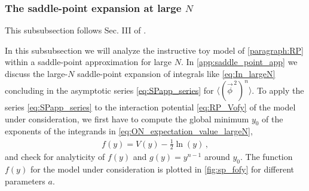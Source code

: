 \subsubsection{The saddle-point expansion at large \texorpdfstring{$N$}{N}}\label{subsubsec:saddle_point}
\begin{disclaimer}
	This subsubsection follows Sec. III of .
\end{disclaimer}
In this subsubsection we will analyze the instructive toy model of \cref{paragraph:RP} within a saddle-point approximation for large $N$.
In \cref{app:saddle_point_app} we discuss the large-$N$ saddle-point expansion of integrals like \eqref{eq:In_largeN} concluding in the asymptotic series \eqref{eq:SPapp_series} for $\langle ( \vec{\phi}^{\, 2} )^n \rangle$.
To apply the series \eqref{eq:SPapp_series} to the interaction potential \eqref{eq:RP_Vofy} of the model under consideration, we first have to compute the global minimum $y_0$ of the exponents of the integrands in \cref{eq:ON_expectation_value_largeN},
\begin{align}
	f ( y ) = V ( y ) - \tfrac{1}{2} \ln ( y ) \, ,\label{eq:fofy}
\end{align}
and check for analyticity of $f ( y )$ and $g ( y ) = y^{n - 1}$ around $y_0$.
The function $f ( y )$ for the model under consideration is plotted in \cref{fig:sp_fofy} for different parameters $a$.

